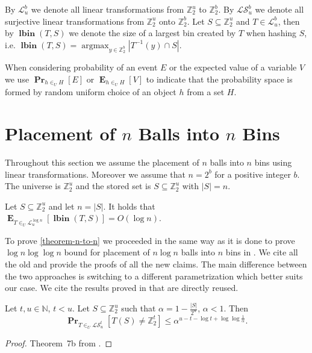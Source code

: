 \documentclass[unicode,review]{siamart1116}
\newcommand{\lbin}[2]{\operatorname{\mathbf{lbin}}({#1}, {#2})}
\newcommand{\vecspace}[2]{\mathbb{Z}_{#1}^{#2}}
\newcommand{\binvecspace}[1]{\vecspace{2}{#1}}
\newcommand{\linearmaps}[2]{\mathcal{L}_{#1}^{#2}}
\newcommand{\surjectivelinearmaps}[2]{\mathcal{LS}_{#1}^{#2}}
\newcommand{\probs}[2]{\operatorname{\mathbf{Pr}}_{{#1}}\left[{#2}\right]}
\newcommand{\expects}[2]{\operatorname{\mathbf{E}}_{{#1}}\left[{#2}\right]}
\numberwithin{theorem}{section}
\begin{document}
By $\linearmaps{u}{b}$ we denote all linear transformations from $\binvecspace{u}$ to $\binvecspace{b}$.
By $\surjectivelinearmaps{u}{b}$ we denote all surjective linear transformations from $\binvecspace{u}$ onto $\binvecspace{b}$.
Let $S \subseteq \binvecspace{u}$ and $T \in \linearmaps{u}{b}$, then by $\lbin{T}{S}$ we denote the size of a largest bin created by $T$ when hashing $S$, i.e. $\lbin{T}{S} = \operatorname{argmax}_{y \in \binvecspace{b}} |T^{-1}(y) \cap S|$.

When considering probability of an event $E$ or the expected value of a variable $V$ we use $\probs{h \in_U H}{E}$ or $\expects{h \in_U H}{V}$ to indicate that the probability space is formed by random uniform choice of an object $h$ from a set $H$.

\section{Placement of \texorpdfstring{$n$}{n} Balls into \texorpdfstring{$n$}{n} Bins}

Throughout this section we assume the placement of $n$ balls into $n$ bins using linear transformations.
Moreover we assume that $n = 2^b$ for a positive integer $b$.
The universe is $\binvecspace{u}$ and the stored set is $S \subseteq \binvecspace{u}$ with $|S| = n$.
\begin{theorem}
\label{theorem-n-to-n}
Let $S \subseteq \binvecspace{u}$ and let $n = |S|$. It holds that $\expects{T \in_U \linearmaps{u}{\log n}}{\lbin{T}{S}} = O(\log n)$.
\end{theorem}
To prove \cref{theorem-n-to-n} we proceeded in the same way as it is done to prove $\log n \log \log n$ bound for placement of $n \log n$ balls into $n$ bins in \cite{alonetal}.
We cite all the old and provide the proofs of all the new claims.
The main difference between the two approaches is switching to a different parametrization which better suits our case.
We cite the results proved in \cite{alonetal} that are directly reused.
\begin{theorem}
\label{theorem-prob-bound}
Let $t, u \in \mathbb{N}$, $t < u$.
Let $S \subseteq \binvecspace{u}$ such that $\alpha = 1 - \frac{|S|}{2^u}$, $\alpha < 1$.
Then 
\[
\probs{T \in_U \surjectivelinearmaps{u}{t}}{T(S) \neq \binvecspace{t}} \leq \alpha^{u - t - \log t + \log \log \frac{1}{\alpha}}.
\]
\end{theorem}
\begin{proof}
Theorem~{7b} from \cite{alonetal}.
\end{proof}
\end{document}

